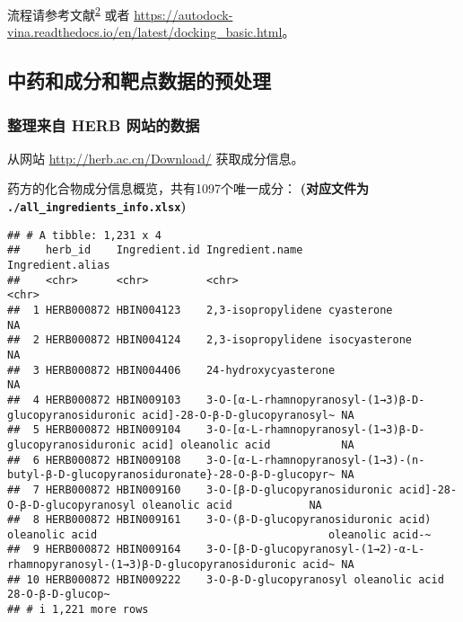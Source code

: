 \documentclass[
]{article}
\begin{document}
流程请参考文献\textsuperscript{\protect\hyperlink{ref-ComputationalPForli2016}{2}} 或者 \url{https://autodock-vina.readthedocs.io/en/latest/docking_basic.html}。

\hypertarget{ux4e2dux836fux548cux6210ux5206ux548cux9776ux70b9ux6570ux636eux7684ux9884ux5904ux7406}{%
\subsection{中药和成分和靶点数据的预处理}\label{ux4e2dux836fux548cux6210ux5206ux548cux9776ux70b9ux6570ux636eux7684ux9884ux5904ux7406}}

\hypertarget{ux6574ux7406ux6765ux81ea-herb-ux7f51ux7ad9ux7684ux6570ux636e}{%
\subsubsection{整理来自 HERB 网站的数据}\label{ux6574ux7406ux6765ux81ea-herb-ux7f51ux7ad9ux7684ux6570ux636e}}

从网站 \url{http://herb.ac.cn/Download/} 获取成分信息。

药方的化合物成分信息概览，共有1097个唯一成分：
\textbf{(对应文件为 \texttt{./all\_ingredients\_info.xlsx})}

\begin{verbatim}
## # A tibble: 1,231 x 4
##    herb_id    Ingredient.id Ingredient.name                                                                       Ingredient.alias
##    <chr>      <chr>         <chr>                                                                                 <chr>           
##  1 HERB000872 HBIN004123    2,3-isopropylidene cyasterone                                                         NA              
##  2 HERB000872 HBIN004124    2,3-isopropylidene isocyasterone                                                      NA              
##  3 HERB000872 HBIN004406    24-hydroxycyasterone                                                                  NA              
##  4 HERB000872 HBIN009103    3-O-[α-L-rhamnopyranosyl-(1→3)β-D-glucopyranosiduronic acid]-28-O-β-D-glucopyranosyl~ NA              
##  5 HERB000872 HBIN009104    3-O-[α-L-rhamnopyranosyl-(1→3)β-D-glucopyranosiduronic acid] oleanolic acid           NA              
##  6 HERB000872 HBIN009108    3-O-[α-L-rhamnopyranosyl-(1→3)-(n-butyl-β-D-glucopyranosiduronate}-28-O-β-D-glucopyr~ NA              
##  7 HERB000872 HBIN009160    3-O-[β-D-glucopyranosiduronic acid]-28-O-β-D-glucopyranosyl oleanolic acid            NA              
##  8 HERB000872 HBIN009161    3-O-(β-D-glucopyranosiduronic acid) oleanolic acid                                    oleanolic acid-~
##  9 HERB000872 HBIN009164    3-O-[β-D-glucopyranosyl-(1→2)-α-L-rhamnopyranosyl-(1→3)β-D-glucopyranosiduronic acid~ NA              
## 10 HERB000872 HBIN009222    3-O-β-D-glucopyranosyl oleanolic acid                                                 28-O-β-D-glucop~
## # i 1,221 more rows
\end{verbatim}
\end{document}
